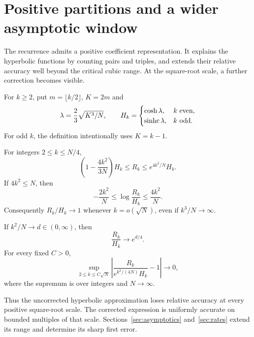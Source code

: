 \section{Positive partitions and a wider asymptotic window}\label{sec:extension}

The recurrence admits a positive coefficient representation. It explains the hyperbolic functions by counting pairs and triples, and extends their relative accuracy well beyond the critical cubic range. At the square-root scale, a further correction becomes visible.

For $k\ge2$, put $m=\lfloor k/2\rfloor$, $K=2m$ and
\begin{equation}\label{eq:hyperdef}
\lambda=\frac23\sqrt{K^3/N},\qquad
H_k=\begin{cases}\cosh\lambda,&k\text{ even},\\
\operatorname{sinhc}\lambda,&k\text{ odd}.
\end{cases}
\end{equation}
For odd $k$, the definition intentionally uses $K=k-1$.



\begin{theorem}\label{thm:window}
For integers $2\le k\le N/4$,
\begin{equation}\label{eq:envelope}
\left(1-\frac{4k^2}{3N}\right)H_k
\le R_k\le e^{4k^2/N}H_k.
\end{equation}
If $4k^2\le N$, then
\begin{equation}\label{eq:logerror}
-\frac{2k^2}N\le\log\frac{R_k}{H_k}\le\frac{4k^2}N.
\end{equation}
Consequently $R_k/H_k\to1$ whenever $k=o(\sqrt N)$, even if $k^3/N\to\infty$.
\end{theorem}

\begin{theorem}\label{thm:sqrt}
If $k^2/N\to d\in(0,\infty)$, then
\begin{equation}\label{eq:sqrtlimit}
\frac{R_k}{H_k}\longrightarrow e^{d/4}.
\end{equation}
For every fixed $C>0$,
\begin{equation}\label{eq:uniformsqrt}
\sup_{2\le k\le C\sqrt N}
\left|\frac{R_k}{e^{k^2/(4N)}H_k}-1\right|\longrightarrow0,
\end{equation}
where the supremum is over integers and $N\to\infty$.
\end{theorem}

Thus the uncorrected hyperbolic approximation loses relative accuracy at every positive square-root scale. The corrected expression is uniformly accurate on bounded multiples of that scale. Sections~\ref{sec:asymptotics} and~\ref{sec:rates} extend its range and determine its sharp first error.

